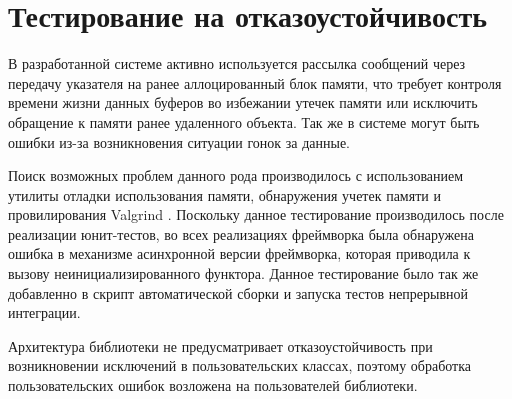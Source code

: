 \section{Тестирование на отказоустойчивость}

В разработанной системе активно используется рассылка сообщений через передачу указателя на ранее аллоцированный блок памяти, что требует контроля времени жизни данных буферов во избежании утечек памяти или исключить обращение к памяти ранее удаленного объекта. Так же в системе могут быть ошибки из-за возникновения ситуации гонок за данные.

Поиск возможных проблем данного рода производилось с использованием утилиты отладки использования памяти, обнаружения учетек памяти и провилирования Valgrind \cite{nethercote2007valgrind}. Поскольку данное тестирование производилось после реализации юнит-тестов, во всех реализациях фреймворка была обнаружена ошибка в механизме асинхронной версии фреймворка, которая приводила к вызову неинициализированного функтора. Данное тестирование было так же добавленно в скрипт автоматической сборки и запуска тестов непрерывной интеграции.

Архитектура библиотеки не предусматривает отказоустойчивость при возникновении исключений в пользовательских классах, поэтому обработка пользовательских ошибок возложена на пользователей библиотеки.